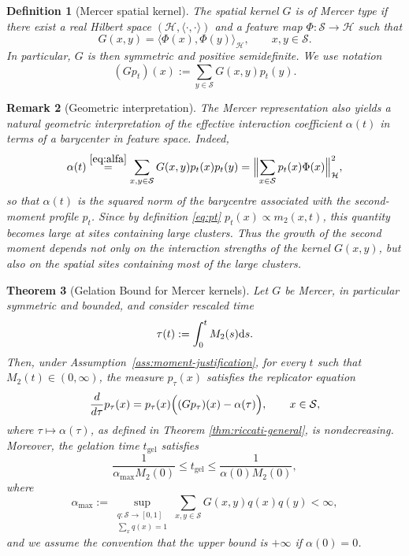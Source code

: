 \documentclass[12pt,twoside]{article}
\newtheorem{thm}{Theorem}[section]
\newtheorem{rem}[thm]{Remark}
\newtheorem{defn}[thm]{Definition}
\begin{document}
\begin{defn}[Mercer spatial kernel]\label{def:mercer}
The spatial kernel $G$ is of Mercer type if there exist a
real Hilbert space $(\mathcal H,\langle\cdot,\cdot\rangle)$ and a feature map
$\Phi:\mathcal S\to\mathcal H$ such that
\begin{equation}\label{eq:mercer}
G(x,y)=\bigl\langle \Phi(x),\Phi(y)\bigr\rangle_{\mathcal H},
\qquad x,y\in\mathcal S.
\end{equation}
In particular, $G$ is then symmetric and positive semidefinite.
We use notation
\[
(Gp_t)(x):=\sum_{y\in\mathcal S} G(x,y)p_t(y).
\]
\end{defn}
\begin{rem}[Geometric interpretation]
The Mercer representation also yields a natural geometric interpretation of the effective interaction coefficient $\alpha(t)$ in terms of a barycenter in feature space. Indeed,
\[
\alpha(t)\overset{\eqref{eq:alfa}}{=}
\sum_{x,y\in\mathcal S}G(x,y)p_t(x)p_t(y)
=
\Bigl\|
\sum_{x\in\mathcal S}p_t(x)\Phi(x)
\Bigr\|_{\mathcal H}^2,
\]
so that \(\alpha(t)\) is the squared norm of the barycentre associated with the second-moment profile \(p_t\). Since by definition \eqref{eq:pt} 
\(p_t(x)\propto m_2(x,t)\),
this quantity becomes large at sites containing large clusters. Thus the growth of the second moment depends not only on the interaction strengths of the kernel \(G(x,y)\), but also on the spatial sites containing most of the large clusters. 
\end{rem}

\begin{thm}[Gelation Bound for Mercer kernels]\label{thm:replicator-mercer}
 Let $G$ be Mercer, in particular symmetric and bounded, and consider rescaled time 
 \begin{equation}\label{eq:tau-def}
\tau(t):=\int_0^t M_2(s) {\rm d}s.
\end{equation}
  Then, under Assumption~\ref{ass:moment-justification},  for every $t$ such that $M_2(t)\in(0,\infty)$, the measure
$p_\tau(x)$ satisfies the replicator equation 
\begin{equation}\label{eq:replicator-mercer}
\frac{d}{d\tau}p_\tau(x)
=
p_\tau(x)\Bigl((Gp_\tau)(x)-\alpha(\tau)\Bigr),
\qquad x\in\mathcal S,
\end{equation}
where $\tau\mapsto \alpha(\tau)$, as defined in Theorem \ref{thm:riccati-general}, is nondecreasing. Moreover,
the gelation time $t_{\mathrm{gel}}$ satisfies
\begin{equation}\label{eq:bounds-mercer}
\frac{1}{\alpha_{\max}M_2(0)}
\leq
t_{\mathrm{gel}}
\leq
\frac{1}{\alpha(0)M_2(0)},
\end{equation}
where
\begin{equation}\label{eq:alpha-max}
\alpha_{\max}
:=
\sup_{\substack{q:\mathcal S\to[0,1]\\ \sum_x q(x)=1}}
\sum_{x,y\in\mathcal S} G(x,y)q(x)q(y)<\infty,
\end{equation}
and we assume the convention that the upper bound is $+\infty$ if $\alpha(0)=0$.
\end{thm}
\end{document}
